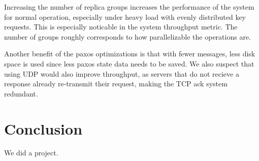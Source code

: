 \documentclass[letterpaper,10pt]{article}
\begin{document}
Increasing the number of replica groups increases the performance of
the system for normal operation, especially under heavy load with
evenly distributed key requests. This is especially noticable in the
system throughput metric.  The number of groups roughly corresponds to
how parallelizable the operations are. 

Another benefit of the paxos optimizations is that with
fewer messages, less disk space is used since less paxos state data
needs to be saved. We also suspect that using UDP would also improve
throughput, as servers that do not recieve a response already
re-transmit their request, making the TCP ack system redundant.

\section{Conclusion}
We did a project.

\end{document}
